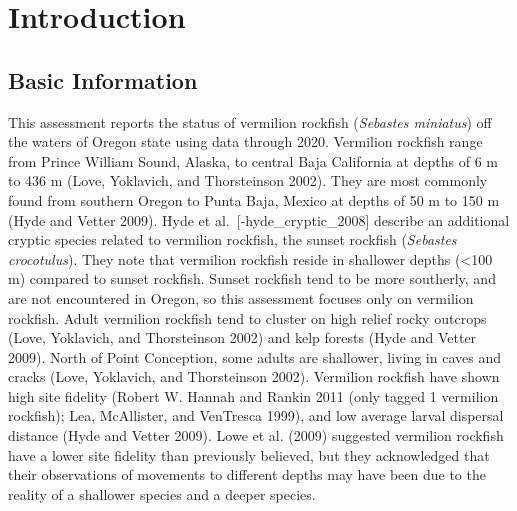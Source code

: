 \documentclass[11pt,
  english,
  a4paper,
]{article}
\begin{document}
\setlength\parskip{0.5em plus 0.1em minus 0.2em}


\hypertarget{introduction}{%
\section{Introduction}\label{introduction}}

\leavevmode\tagmcend\tagstructend


\hypertarget{basic-information}{%
\subsection{Basic Information}\label{basic-information}}

\leavevmode\tagmcend\tagstructend


This assessment reports the status of vermilion rockfish (\emph{Sebastes miniatus}) off the waters of Oregon state using data through 2020. Vermilion rockfish range from Prince William Sound, Alaska, to central Baja California at depths of 6 m to 436 m {(Love, Yoklavich, and Thorsteinson 2002)\leavevmode\tagmcend\tagstructend}. They are most commonly found from southern Oregon to Punta Baja, Mexico at depths of 50 m to 150 m {(Hyde and Vetter 2009)\leavevmode\tagmcend\tagstructend}. Hyde et al.~{[}-hyde\_cryptic\_2008{]} describe an additional cryptic species related to vermilion rockfish, the sunset rockfish (\emph{Sebastes crocotulus}). They note that vermilion rockfish reside in shallower depths (\textless100 m) compared to sunset rockfish. Sunset rockfish tend to be more southerly, and are not encountered in Oregon, so this assessment focuses only on vermilion rockfish. Adult vermilion rockfish tend to cluster on high relief rocky outcrops {(Love, Yoklavich, and Thorsteinson 2002)\leavevmode\tagmcend\tagstructend} and kelp forests {(Hyde and Vetter 2009)\leavevmode\tagmcend\tagstructend}. North of Point Conception, some adults are shallower, living in caves and cracks {(Love, Yoklavich, and Thorsteinson 2002)\leavevmode\tagmcend\tagstructend}. Vermilion rockfish have shown high site fidelity {(Robert W. Hannah and Rankin 2011 (only tagged 1 vermilion rockfish); Lea, McAllister, and VenTresca 1999)\leavevmode\tagmcend\tagstructend}, and low average larval dispersal distance {(Hyde and Vetter 2009)\leavevmode\tagmcend\tagstructend}. Lowe et al. {(2009)\leavevmode\tagmcend\tagstructend} suggested vermilion rockfish have a lower site fidelity than previously believed, but they acknowledged that their observations of movements to different depths may have been due to the reality of a shallower species and a deeper species.
\end{document}
